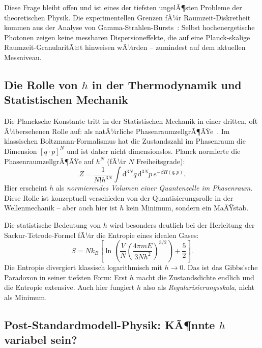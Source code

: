 ﻿\documentclass[12pt,a4paper]{article}
\theoremstyle{plain}
\theoremstyle{definition}
\theoremstyle{remark}
\begin{document}
Diese Frage bleibt offen und ist eines der tiefsten ungelÃ¶sten Probleme der
theoretischen Physik. Die experimentellen Grenzen fÃ¼r Raumzeit-Diskretheit kommen aus
der Analyse von Gamma-Strahlen-Bursts~\cite{amelino2013}: Selbst hochenergetische Photonen
zeigen keine messbaren Dispersioneffekte, die auf eine Planck-skalige Raumzeit-GranularitÃ¤t
hinweisen wÃ¼rden -- zumindest auf dem aktuellen Messniveau.

\subsection{Die Rolle von $h$ in der Thermodynamik und Statistischen Mechanik}

Die Plancksche Konstante tritt in der Statistischen Mechanik in einer dritten, oft
Ã¼bersehenen Rolle auf: als natÃ¼rliche PhasenraumzellgrÃ¶ÃŸe~\cite{landau1980}. Im
klassischen Boltzmann-Formalismus hat die Zustandszahl im Phasenraum die Dimension
$[q \cdot p]^N$ und ist daher nicht dimensionslos. Planck normierte die PhasenraumzellgrÃ¶ÃŸe
auf $h^N$ (fÃ¼r $N$ Freiheitsgrade):
\begin{equation}
  Z = \frac{1}{N! h^{3N}} \int \mathrm{d}^{3N}q\,\mathrm{d}^{3N}p\,e^{-\beta H(q,p)}.
\end{equation}
Hier erscheint $h$ als \emph{normierendes Volumen einer Quantenzelle im Phasenraum}.
Diese Rolle ist konzeptuell verschieden von der Quantisierungsrolle in der
Wellenmechanik -- aber auch hier ist $h$ kein Minimum, sondern ein MaÃŸstab.

Die statistische Bedeutung von $h$ wird besonders deutlich bei der Herleitung der
Sackur-Tetrode-Formel fÃ¼r die Entropie eines idealen Gases:
\begin{equation}
  S = Nk_B \left[\ln\!\left(\frac{V}{N}\left(\frac{4\pi m E}{3Nh^2}\right)^{3/2}\right) + \frac{5}{2}\right].
\end{equation}
Die Entropie divergiert klassisch logarithmisch mit $h \to 0$. Das ist das Gibbs'sche
Paradoxon in seiner tiefsten Form: Erst $h$ macht die Zustandsdichte endlich und die
Entropie extensive. Auch hier fungiert $h$ also als \emph{Regularisierungsskala}, nicht als Minimum.

\subsection{Post-Standardmodell-Physik: KÃ¶nnte $h$ variabel sein?}
\end{document}
